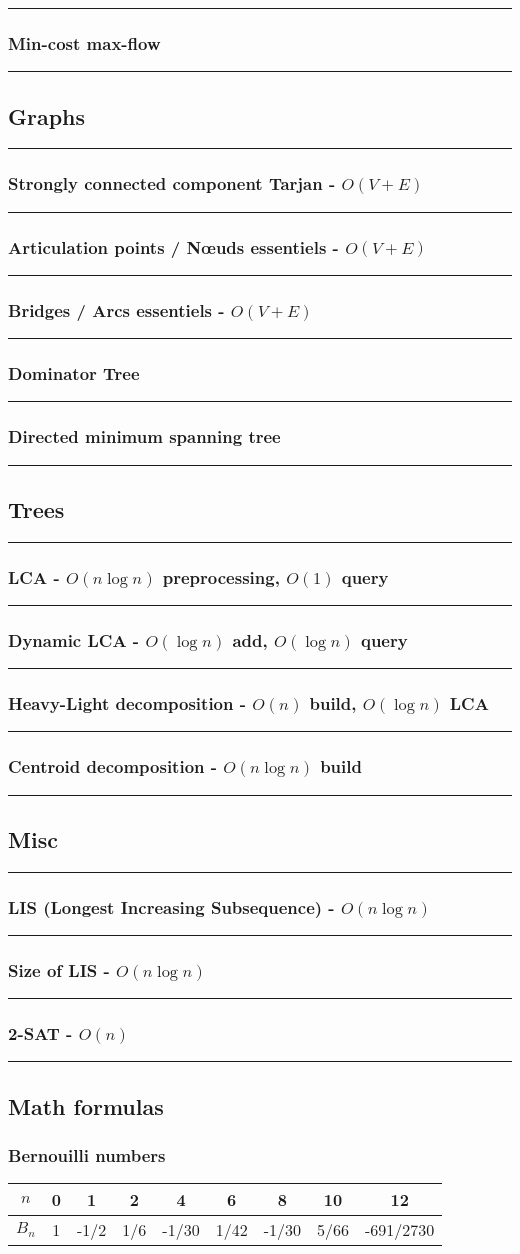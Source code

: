 \documentclass[landscape,a4paper,twocolumn,10pt]{report}
\renewcommand{\line}{\noindent\rule{\linewidth}{1pt}}
\newcommand{\algosection}[1]{\line \subsection*{#1}}
\newcommand{\algorithm}[1]{\line \subsubsection*{#1}}
\begin{document}
% 

\algorithm{Min-cost max-flow}



\algosection{Graphs}
\label{graphs}

\algorithm{Strongly connected component Tarjan - $O(V + E)$}


%

\algorithm{Articulation points / N\oe uds essentiels - $O(V + E)$}


\algorithm{Bridges / Arcs essentiels - $O(V + E)$}


\algorithm{Dominator Tree}


\algorithm{Directed minimum spanning tree}


\algosection{Trees}
\label{trees}

\algorithm{LCA - $O(n \log n)$ preprocessing, $O(1)$ query}


\algorithm{Dynamic LCA - $O(\log n)$ add, $O(\log n)$ query}


\algorithm{Heavy-Light decomposition - $O(n)$ build, $O(\log n)$ LCA}


\algorithm{Centroid decomposition - $O(n \log n)$ build}



\algosection{Misc}
\label{misc}

\algorithm{LIS (Longest Increasing Subsequence) - $O(n \log n)$}


\algorithm{Size of LIS - $O(n \log n)$}


\algorithm{2-SAT - $O(n)$}


\algosection{Math formulas}
\label{mathformulas}

\subsubsection*{Bernouilli numbers}

\begin{tabular}{|c|c|c|c|c|c|c|c|c|}
\hline
$n$ & 0 & 1 & 2 & 4 & 6 & 8 & 10 & 12\\
\hline
$B_n$ & 1 & -1/2 & 1/6 & -1/30 & 1/42 & -1/30 & 5/66 & -691/2730 \\
\hline
\end{tabular}
\end{document}
